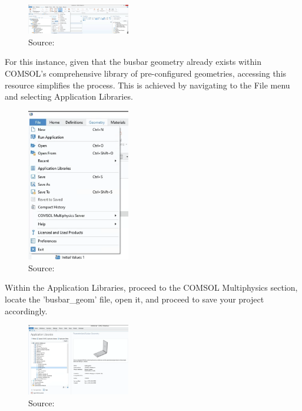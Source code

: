 \begin{figure}[ht!]
  \centering
  \includegraphics[width=0.4\textwidth]{Chapters/Figures/Chapter 3 Figures/Geometry Tab.png}
  \caption{ Source: \cite{}}
  \label{}
\end{figure}

For this instance, given that the busbar geometry already exists within COMSOL's comprehensive library of pre-configured geometries, accessing this resource simplifies the process. This is achieved by navigating to the File menu and selecting Application Libraries.

\begin{figure}[ht!]
  \centering
  \includegraphics[width=0.4\textwidth]{Chapters/Figures/Chapter 3 Figures/Application Libraries Button.png}
  \caption{ Source: \cite{}}
  \label{}
\end{figure}

Within the Application Libraries, proceed to the COMSOL Multiphysics section, locate the 'busbar\_geom' file, open it, and proceed to save your project accordingly.


\begin{figure}[ht!]
  \centering
  \includegraphics[width=0.4\textwidth]{Chapters/Figures/Chapter 3 Figures/Application Libraries.png}
  \caption{ Source: \cite{}}
  \label{}
\end{figure}

